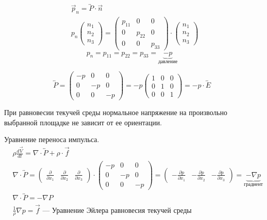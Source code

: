 \begin{note}
  \begin{align*}
    &\vec{p}_n = \overleftrightarrow{P} \cdot \vec{n} \\
    &p_n \begin{pmatrix}
        n_1 \\
        n_2 \\
        n_3
      \end{pmatrix} = \begin{pmatrix} p_{11} &0 &0 \\
        0 &p_{22} &0 \\
        0 &0 &p_{33}
    \end{pmatrix} \cdot
               \begin{pmatrix}
                 n_1 \\
                 n_2 \\
                 n_3
               \end{pmatrix}
  \end{align*}
\[
p_n = p_{11} = p_{22} = p_{33} = \underbrace{-p}_{\text{давление}}
\]
\end{note}

\[
\overleftrightarrow{P} =
\begin{pmatrix}
  -p &0 &0\\
  0 &-p &0\\
  0 &0 &-p
\end{pmatrix} = -p
\begin{pmatrix}
  1 &0 &0 \\
  0 &1 &0 \\
  0 &0 &1
\end{pmatrix} = -p \cdot \overleftrightarrow{E}
\]

\begin{note}
  При равновесии текучей среды нормальное напряжение на произвольно выбранной
  площадке не зависит от ее ориентации.
\end{note}

Уравнение переноса импульса.
\begin{align*}
  & \rho \frac{d\vec{V}}{dt} = \nabla \cdot \overleftrightarrow{P} + \rho \cdot \vec{f} \\
  & \nabla \cdot \overleftrightarrow{P} = \begin{pmatrix}
      \frac{\partial}{\partial x_1} & \frac{\partial}{\partial x_2} & \frac{\partial}{\partial x_3}
    \end{pmatrix} \cdot \begin{pmatrix}
      -p &0 &0 \\
      0 &-p &0 \\
      0 &0 &-p
    \end{pmatrix} = \begin{pmatrix}
      -\frac{\partial p}{\partial x_1} & -\frac{\partial p}{\partial x_2} & -\frac{\partial p}{\partial x_3}
    \end{pmatrix} = \underbrace{-\nabla p}_{\text{градиент}}\\
  &\nabla \cdot \overleftrightarrow{P}= - \nabla P \\
  &\frac 1\rho \nabla p = \vec{f} \text{ --- Уравнение Эйлера равновесия текучей среды}
\end{align*}

